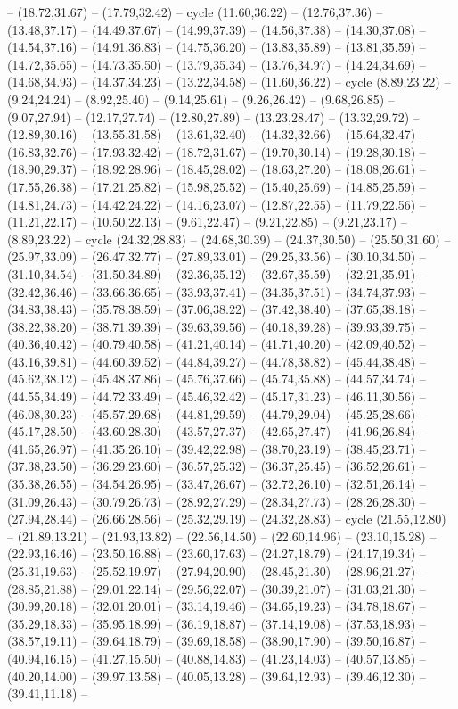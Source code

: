 {-- (18.72,31.67) -- (17.79,32.42) -- cycle (11.60,36.22) -- (12.76,37.36) -- (13.48,37.17) -- (14.49,37.67) -- (14.99,37.39) -- (14.56,37.38) -- (14.30,37.08) -- (14.54,37.16) -- (14.91,36.83) -- (14.75,36.20) -- (13.83,35.89) -- (13.81,35.59) -- (14.72,35.65) -- (14.73,35.50) -- (13.79,35.34) -- (13.76,34.97) -- (14.24,34.69) -- (14.68,34.93) -- (14.37,34.23) -- (13.22,34.58) -- (11.60,36.22) -- cycle (8.89,23.22) -- (9.24,24.24) -- (8.92,25.40) -- (9.14,25.61) -- (9.26,26.42) -- (9.68,26.85) -- (9.07,27.94) -- (12.17,27.74) -- (12.80,27.89) -- (13.23,28.47) -- (13.32,29.72) -- (12.89,30.16) -- (13.55,31.58) -- (13.61,32.40) -- (14.32,32.66) -- (15.64,32.47) -- (16.83,32.76) -- (17.93,32.42) -- (18.72,31.67) -- (19.70,30.14) -- (19.28,30.18) -- (18.90,29.37) -- (18.92,28.96) -- (18.45,28.02) -- (18.63,27.20) -- (18.08,26.61) -- (17.55,26.38) -- (17.21,25.82) -- (15.98,25.52) -- (15.40,25.69) -- (14.85,25.59) -- (14.81,24.73) -- (14.42,24.22) -- (14.16,23.07) -- (12.87,22.55) -- (11.79,22.56) -- (11.21,22.17) -- (10.50,22.13) -- (9.61,22.47) -- (9.21,22.85) -- (9.21,23.17) -- (8.89,23.22) -- cycle (24.32,28.83) -- (24.68,30.39) -- (24.37,30.50) -- (25.50,31.60) -- (25.97,33.09) -- (26.47,32.77) -- (27.89,33.01) -- (29.25,33.56) -- (30.10,34.50) -- (31.10,34.54) -- (31.50,34.89) -- (32.36,35.12) -- (32.67,35.59) -- (32.21,35.91) -- (32.42,36.46) -- (33.66,36.65) -- (33.93,37.41) -- (34.35,37.51) -- (34.74,37.93) -- (34.83,38.43) -- (35.78,38.59) -- (37.06,38.22) -- (37.42,38.40) -- (37.65,38.18) -- (38.22,38.20) -- (38.71,39.39) -- (39.63,39.56) -- (40.18,39.28) -- (39.93,39.75) -- (40.36,40.42) -- (40.79,40.58) -- (41.21,40.14) -- (41.71,40.20) -- (42.09,40.52) -- (43.16,39.81) -- (44.60,39.52) -- (44.84,39.27) -- (44.78,38.82) -- (45.44,38.48) -- (45.62,38.12) -- (45.48,37.86) -- (45.76,37.66) -- (45.74,35.88) -- (44.57,34.74) -- (44.55,34.49) -- (44.72,33.49) -- (45.46,32.42) -- (45.17,31.23) -- (46.11,30.56) -- (46.08,30.23) -- (45.57,29.68) -- (44.81,29.59) -- (44.79,29.04) -- (45.25,28.66) -- (45.17,28.50) -- (43.60,28.30) -- (43.57,27.37) -- (42.65,27.47) -- (41.96,26.84) -- (41.65,26.97) -- (41.35,26.10) -- (39.42,22.98) -- (38.70,23.19) -- (38.45,23.71) -- (37.38,23.50) -- (36.29,23.60) -- (36.57,25.32) -- (36.37,25.45) -- (36.52,26.61) -- (35.38,26.55) -- (34.54,26.95) -- (33.47,26.67) -- (32.72,26.10) -- (32.51,26.14) -- (31.09,26.43) -- (30.79,26.73) -- (28.92,27.29) -- (28.34,27.73) -- (28.26,28.30) -- (27.94,28.44) -- (26.66,28.56) -- (25.32,29.19) -- (24.32,28.83) -- cycle (21.55,12.80) -- (21.89,13.21) -- (21.93,13.82) -- (22.56,14.50) -- (22.60,14.96) -- (23.10,15.28) -- (22.93,16.46) -- (23.50,16.88) -- (23.60,17.63) -- (24.27,18.79) -- (24.17,19.34) -- (25.31,19.63) -- (25.52,19.97) -- (27.94,20.90) -- (28.45,21.30) -- (28.96,21.27) -- (28.85,21.88) -- (29.01,22.14) -- (29.56,22.07) -- (30.39,21.07) -- (31.03,21.30) -- (30.99,20.18) -- (32.01,20.01) -- (33.14,19.46) -- (34.65,19.23) -- (34.78,18.67) -- (35.29,18.33) -- (35.95,18.99) -- (36.19,18.87) -- (37.14,19.08) -- (37.53,18.93) -- (38.57,19.11) -- (39.64,18.79) -- (39.69,18.58) -- (38.90,17.90) -- (39.50,16.87) -- (40.94,16.15) -- (41.27,15.50) -- (40.88,14.83) -- (41.23,14.03) -- (40.57,13.85) -- (40.20,14.00) -- (39.97,13.58) -- (40.05,13.28) -- (39.64,12.93) -- (39.46,12.30) -- (39.41,11.18) -- }
